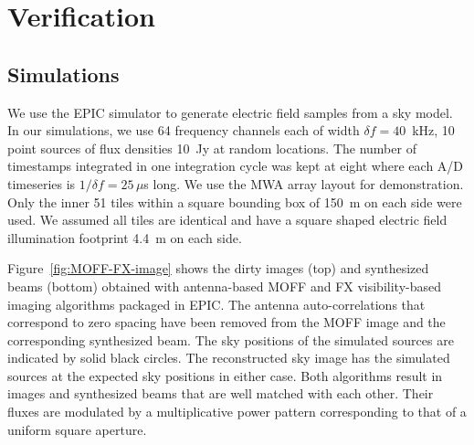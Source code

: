 \documentclass[a4paper,fleqn,usenatbib]{../mnras}
\begin{document}
\section{Verification}\label{sec:verify}

\subsection{Simulations}\label{sec:sim}

We use the EPIC simulator to generate electric field samples from a sky model. In
our simulations, we use 64 frequency channels each of width $\delta f = 40$~kHz, 
10 point sources of flux densities 10~Jy at random locations. The number of
timestamps integrated in one integration cycle was kept at eight where each A/D 
timeseries is $1/\delta f=25\,\mu$s long. We use the MWA array layout 
\citep{bea12} for demonstration. Only the inner 51 tiles within a square bounding
box of 150~m on each side were used. We assumed all tiles are identical and have 
a square shaped electric field illumination footprint 4.4~m on each side. 

Figure~\ref{fig:MOFF-FX-image} shows the dirty images (top) and synthesized beams
(bottom) obtained with antenna-based MOFF and FX visibility-based imaging 
algorithms packaged in EPIC. The antenna auto-correlations that correspond to 
zero spacing have been removed from the MOFF image and the corresponding 
synthesized beam. The sky positions of the simulated sources are indicated by 
solid black circles. The reconstructed sky image has the simulated sources at the
expected sky positions in either case. Both algorithms result in images and 
synthesized beams that are well matched with each other. Their fluxes are 
modulated by a multiplicative power pattern corresponding to that of a uniform
square aperture. 
\end{document}
